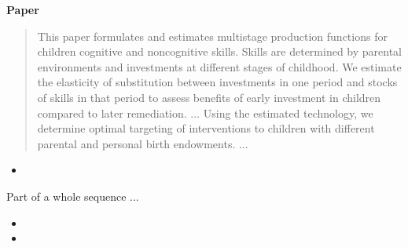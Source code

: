\begin{frame}\begin{center}
{\LARGE\textbf{Paper}}
\end{center}\end{frame}
\begin{frame}
\begin{quote}\small
This paper formulates and estimates multistage production functions for children cognitive and noncognitive skills. Skills are determined by parental environments and investments at different stages of childhood. We estimate the elasticity of substitution between investments in one period and stocks of skills in that period to assess benefits of early investment in children compared to later remediation. $\hdots$ Using the estimated technology, we determine optimal targeting of interventions to children with different parental and personal birth endowments. $\hdots$
\end{quote}
\end{frame}
\begin{frame}
\begin{itemize}
\item{}
\end{itemize}\vspace{0.3cm}

Part of a whole sequence ...\vspace{0.3cm}

{\scriptsize\begin{itemize}
\item{}
\item{}
\end{itemize}}\vspace{0.3cm}

\end{frame}

